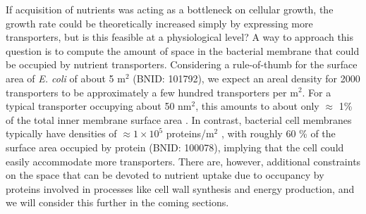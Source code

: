 
If acquisition of nutrients was acting as a bottleneck on cellular growth, the growth rate could be theoretically
increased simply by expressing more transporters, but is this feasible at a
physiological level? A way to approach this question is to compute the amount of
space in the bacterial membrane that could be occupied by nutrient transporters.
Considering a rule-of-thumb for the surface area of \textit{E. coli} of about 5
\textmu m$^2$ (BNID: 101792), we expect an areal density for 2000 transporters
to be approximately a few hundred transporters per \textmu m$^2$. For a typical transporter
occupying about 50 nm$^2$, this amounts to about only $\approx$ 1\% of the total
inner membrane surface area \citep{szenk2017}. In contrast, bacterial cell membranes
typically have densities of $\approx 1 \times 10^5$ proteins/\textmu m$^2$ \citep{phillips2018},
with roughly 60 \% of the surface area occupied by protein (BNID: 100078),
implying that the cell could easily accommodate more transporters. There are,
however, additional constraints on the space that  can be devoted to nutrient
uptake due to occupancy by proteins involved in processes like cell wall
synthesis and energy production, and we will consider this further in the coming
sections.
